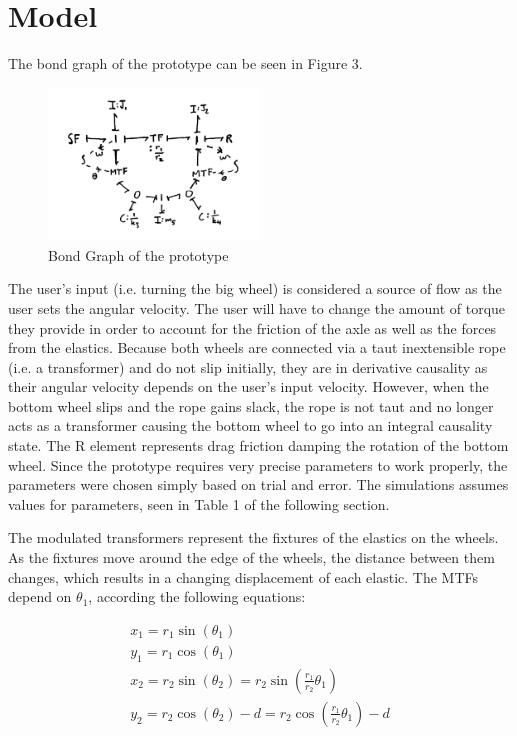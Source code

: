 \documentclass[twoside,twocolumn]{article}
\begin{document}
\section{Model}

The bond graph of the prototype can be seen in Figure 3.
\begin{figure}[!h]
    \caption{Bond Graph of the prototype}
    \centering
        \includegraphics[width=0.5\textwidth]{bg.png}
\end{figure}

The user's input (i.e. turning the big wheel) is considered a source of flow as the user sets the angular velocity. The user will have to change the amount of torque they provide in order to account for the friction of the axle as well as the forces from the elastics. Because both wheels are connected via a taut inextensible rope (i.e. a transformer) and do not slip initially, they are in derivative causality as their angular velocity depends on the user's input velocity. However, when the bottom wheel slips and the rope gains slack, the rope is not taut and no longer acts as a transformer causing the bottom wheel to go into an integral causality state. The R element represents drag friction damping the rotation of the bottom wheel. Since the prototype requires very precise parameters to work properly, the parameters were chosen simply based on trial and error. The simulations assumes values for parameters, seen in Table 1 of the following section.

The modulated transformers represent the fixtures of the elastics on the wheels. As the fixtures move around the edge of the wheels, the distance between them changes, which results in a changing displacement of each elastic. The MTFs depend on $\theta_1$, according the following equations:

\begin{gather*}
x_1 = r_1 \sin(\theta_1) \\
y_1 = r_1 \cos(\theta_1) \\
x_2 = r_2 \sin(\theta_2) = r_2 \sin \left( \frac{r_1}{r_2} \theta_1 \right) \\
y_2 = r_2 \cos(\theta_2) - d = r_2 \cos \left( \frac{r_1}{r_2} \theta_1 \right) - d \\
\end{gather*}
\end{document}
